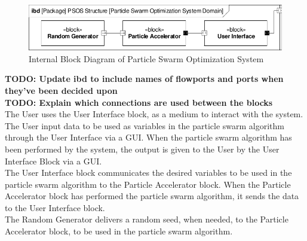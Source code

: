 \begin{figure}[H]
	\centering
	\includegraphics[width=0.8\linewidth]{diagram/ibd_particle_swarm_optimization_system.pdf}
	\caption{Internal Block Diagram of Particle Swarm Optimization System}
	\label{fig:ibd}
\end{figure}

\textbf{TODO: Update ibd to include names of flowports and ports when they've been decided upon}\\
\textbf{TODO: Explain which connections are used between the blocks}\\

The User uses the User Interface block, as a medium to interact with the system. The User input data to be used as variables in the particle swarm algorithm through the User Interface via a GUI. When the particle swarm algorithm has been performed by the system, the output is given to the User by the User Interface Block via a GUI.\\

The User Interface block communicates the desired variables to be used in the particle swarm algorithm to the Particle Accelerator block. When the Particle Accelerator block has performed the particle swarm algorithm, it sends the data to the User Interface block.\\

The Random Generator delivers a random seed, when needed, to the Particle Accelerator block, to be used in the particle swarm algorithm.\\

